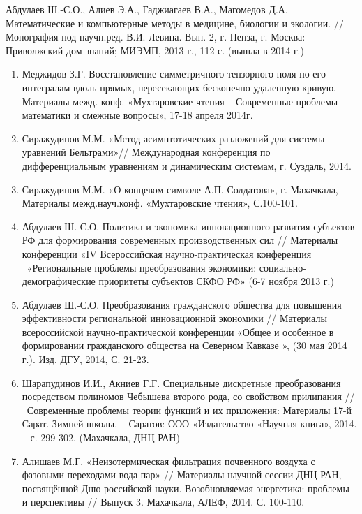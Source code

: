 \noindent Абдулаев Ш.-С.О., Алиев Э.А., Гаджиагаев В.А., Магомедов Д.А. Математические и компьютерные методы в медицине, биологии и экологии. // Монография под научн.ред. В.И. Левина. Вып. 2, г. Пенза, г. Москва: Приволжский дом знаний; МИЭМП, 2013 г., 112 с. (вышла в 2014 г.) \eject

\begin{enumerate}
\item  Меджидов З.Г. Восстановление симметричного тензорного поля по его интегралам вдоль прямых, пересекающих бесконечно удаленную кривую. Материалы межд. конф. «Мухтаровские чтения -- Современные проблемы математики и смежные вопросы», 17-18 апреля 2014г.

\item  Сиражудинов М.М. «Метод асимптотических разложений для системы уравнений Бельтрами»// Международная конференция по дифференциальным уравнениям  и динамическим системам, г. Суздаль, 2014.

\item  Сиражудинов М.М. «О концевом символе А.П. Солдатова», г. Махачкала, Материалы межд.науч.конф. «Мухтаровские чтения», С.100-101.

\item  Абдулаев Ш.-С.О. Политика и экономика инновационного развития субъектов РФ для формирования современных производственных сил // Материалы конференции «IV Всероссийская научно-практическая конференция ~«Региональные проблемы преобразования экономики: социально-демографические приоритеты субъектов СКФО РФ» (6-7 ноября 2013 г.)

\item  Абдулаев Ш.-С.О. Преобразования гражданского общества для повышения эффективности региональной инновационной экономики // Материалы всероссийской научно-практической конференции «Общее и особенное в формировании гражданского общества на Северном Кавказе », (30 мая 2014 г.). Изд. ДГУ, 2014, С. 21-23.

\item  Шарапудинов И.И., Акниев Г.Г. Специальные дискретные преобразования посредством полиномов Чебышева второго рода, со свойством прилипания // ~Современные проблемы теории функций и их приложения: Материалы 17-й Сарат. Зимней школы. -- Саратов: ООО «Издательство «Научная книга», 2014. -- с. 299-302. (Махачкала, ДНЦ РАН)

\item  Алишаев М.Г. «Неизотермическая фильтрация почвенного воздуха с фазовыми переходами вода-пар» // Материалы научной сессии ДНЦ РАН, посвящённой Дню российской науки. Возобновляемая энергетика: проблемы и перспективы // Выпуск 3. Махачкала, АЛЕФ, 2014. С. 100-110.


\end{enumerate}
